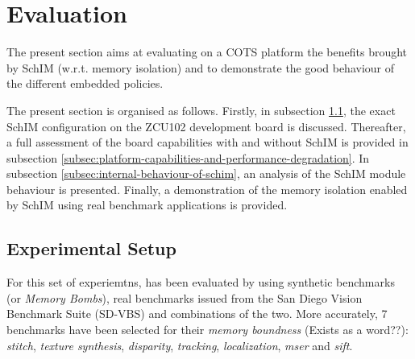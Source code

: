 \section{Evaluation}

  The present section aims at evaluating on a COTS platform the benefits brought by SchIM (w.r.t. memory isolation) and to demonstrate the good behaviour of the different embedded policies.
  
  The present section is organised as follows. Firstly, in subsection \ref{subsection:considered-architecture}, the exact SchIM configuration on the ZCU102 development board is discussed. Thereafter, a full assessment of the board capabilities with and without SchIM is provided in subsection \ref{subsec:platform-capabilities-and-performance-degradation}. In subsection \ref{subsec:internal-behaviour-of-schim}, an analysis of the SchIM module behaviour is presented. Finally, a demonstration of the memory isolation enabled by SchIM using real benchmark applications is provided.

  
  \subsection{Experimental Setup}
    \label{subsection:considered-architecture}
    For this set of experiemtns, \schim has been evaluated by using synthetic benchmarks (or \emph{Memory Bombs}), real benchmarks issued from the San Diego Vision Benchmark Suite (SD-VBS) \cite{SD-VBS} and combinations of the two. More accurately, 7 benchmarks have been selected for their \emph{memory boundness} (Exists as a word??): \emph{stitch}, \emph{texture synthesis}, \emph{disparity}, \emph{tracking}, \emph{localization}, \emph{mser} and \emph{sift}. 

